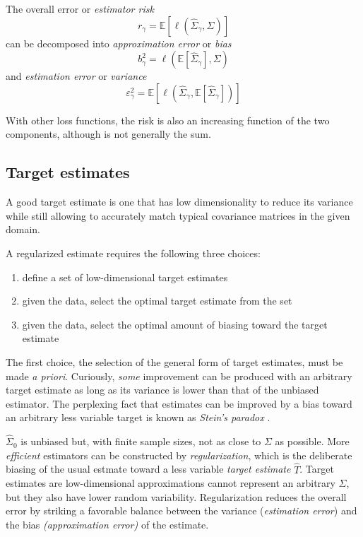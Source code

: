 The overall error or \emph{estimator risk} 
\begin{equation}
r_\gamma = \mathbb E\left[ \ell\left(\hat\Sigma_\gamma,\Sigma\right) \right]
\end{equation}
can be decomposed into \emph{approximation error} or \emph{bias}   
\begin{equation}
b_\gamma^2 = \ell \left( \mathbb E\left[\hat \Sigma_\gamma\right],\Sigma\right)
\end{equation}
and \emph{estimation error} or \emph{variance}
\begin{equation}
\varepsilon_\gamma^2 = \mathbb E \left[ \ell\left(\hat \Sigma_\gamma, 
\mathbb E\left[\hat \Sigma_\gamma\right]\right) \right]
\end{equation}


With other loss functions, the risk is also an increasing function of the two components, although is not generally the sum.



  
\subsection{Target estimates}
A good target estimate is one that has low dimensionality to reduce its variance while still allowing to accurately match typical covariance matrices in the given domain. 

A regularized estimate requires the following three choices: 
\begin{enumerate}[  1. ]
\item define a set of low-dimensional target estimates
\item given the data, select the optimal target estimate from the set 
\item given the data, select the optimal amount of biasing toward the target estimate
\end{enumerate}
The first choice, the selection of the general form of target estimates, must be made \emph{a priori}.  Curiously, \emph{some} improvement can be produced with an arbitrary target estimate as long as its variance is lower than that of the unbiased estimator.  The perplexing fact that estimates can be improved by a bias toward an arbitrary less variable target is known as \emph{Stein's paradox} \citep{Efron:1977}.  

$\hat\Sigma_0$ is unbiased but, with finite sample sizes, not as close to $\Sigma$ as possible.  More \emph{efficient} estimators can be constructed by \emph{regularization}, which is the deliberate biasing of the usual estmate toward a less variable \emph{target estimate} $\hat T$. Target estimates are low-dimensional approximations cannot represent an arbitrary $\Sigma$, but they also have lower random variability.
Regularization reduces the overall error by striking a favorable balance between the variance  (\emph{estimation error}) and the bias \emph{(approximation error)} of the estimate.  


